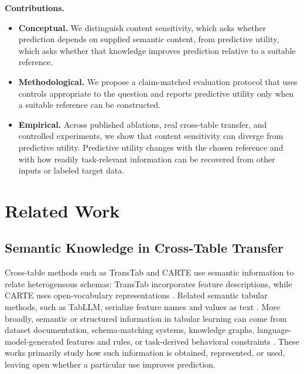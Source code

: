 \documentclass{article} %
\begin{document}
\noindent\textbf{Contributions.}
\begin{itemize}[leftmargin=1.2em, labelsep=0.4em,
                itemsep=1pt, topsep=1pt, parsep=0pt, partopsep=0pt]

\item \textbf{Conceptual.} We distinguish content sensitivity, which asks whether prediction depends on supplied semantic content, from predictive utility, which asks whether that knowledge improves prediction relative to a suitable reference.
\item \textbf{Methodological.} We propose a claim-matched evaluation protocol that uses controls appropriate to the question and reports predictive utility only when a suitable reference can be constructed.
\item \textbf{Empirical.} Across published ablations, real cross-table transfer, and controlled experiments, we show that content sensitivity can diverge from predictive utility. Predictive utility changes with the chosen reference and with how readily task-relevant information can be recovered from other inputs or labeled target data.

\end{itemize}

\section{Related Work}

\subsection{Semantic Knowledge in Cross-Table Transfer}

Cross-table methods such as TransTab and CARTE use semantic information to relate heterogeneous schemas: TransTab incorporates feature descriptions, while CARTE uses open-vocabulary representations \citep{wang2022transtab,kim2024carte}. Related semantic tabular methods, such as TabLLM, serialize feature names and values as text \citep{hegselmann2023tabllm}.
More broadly, semantic or structured information in tabular learning can come from dataset documentation, schema-matching systems, knowledge graphs, language-model-generated features and rules, or task-derived behavioral constraints \citep{pang2015biobankconnect,li2025harmonization,ruiz2023plato,han2024featllm,kim2025kinematics}.
These works primarily study how such information is obtained, represented, or used, leaving open whether a particular use improves prediction.
\end{document}
